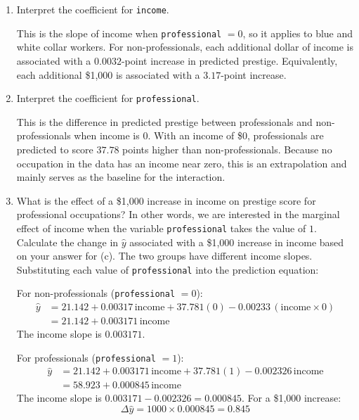 \documentclass[12pt,letterpaper]{article}
\begin{document}
\begin{enumerate}
  \[
  \hat{y} = 21.142 + 0.00317\,\text{income} + 37.781\,\text{professional} - 0.00233\,(\text{income} \times \text{professional})
  \]
  
\newpage
	\item [(d)]
	Interpret the coefficient for \texttt{income}.
	
	This is the slope of income when \texttt{professional} $=0$, so it applies to blue and white collar workers. For non-professionals, each additional dollar of income is associated with a $0.0032$-point increase in predicted prestige. Equivalently, each additional \$1,000 is associated with a $3.17$-point increase.
	\vspace{10cm}	
	\item [(e)]
	Interpret the coefficient for \texttt{professional}.
	
	This is the difference in predicted prestige between professionals and non-professionals when income is $0$. With an income of \$0, professionals are predicted to score $37.78$ points higher than non-professionals. Because no occupation in the data has an income near zero, this is an extrapolation and mainly serves as the baseline for the interaction.

	\newpage
	\item [(f)]
	What is the effect of a \$1,000 increase in income on prestige score for professional occupations? In other words, we are interested in the marginal effect of income when the variable \texttt{professional} takes the value of $1$. Calculate the change in $\hat{y}$ associated with a \$1,000 increase in income based on your answer for (c).
	The two groups have different income slopes. Substituting each value of \texttt{professional} into the prediction equation:

  \noindent For non-professionals (\texttt{professional} $=0$):
  \begin{align*}
  \hat{y} &= 21.142 + 0.00317\,\text{income} + 37.781(0) - 0.00233\,(\text{income}\times 0)\\
  &= 21.142 + 0.003171\,\text{income}
  \end{align*}
  The income slope is $0.003171$.
  
  \noindent For professionals (\texttt{professional} $=1$):
  \begin{align*}
  \hat{y} &= 21.142 + 0.003171\,\text{income} + 37.781(1) - 0.002326\,\text{income}\\
  &= 58.923 + 0.000845\,\text{income}
  \end{align*}
  The income slope is $0.003171 - 0.002326 = 0.000845$. For a \$1,000 increase:
  \[
  \Delta\hat{y} = 1000 \times 0.000845 = 0.845
  \]
  

\end{enumerate}
\end{document}
